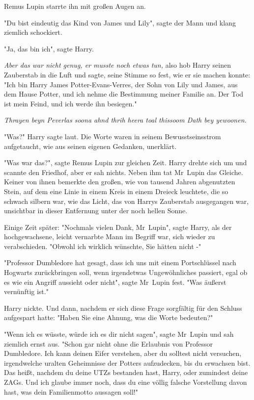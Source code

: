 {Remus Lupin starrte ihn mit großen Augen an.

"Du bist eindeutig das Kind von James und Lily", sagte der Mann und klang ziemlich schockiert.

"Ja, das bin ich", sagte Harry.

\emph{Aber das war nicht genug, er musste noch etwas tun,} also hob Harry seinen Zauberstab in die Luft und sagte, seine Stimme so fest, wie er sie machen konnte: "Ich bin Harry James Potter-Evans-Verres, der Sohn von Lily und James, aus dem Hause Potter, und ich nehme die Bestimmung meiner Familie an. Der Tod ist mein Feind, und ich werde ihn besiegen."

\emph{Thrayen beyn Peverlas soona ahnd thrih heera toal thissoom Dath bey yewoonen.}

"Was?" Harry sagte laut. Die Worte waren in seinem Bewusstseinsstrom aufgetaucht, wie aus seinen eigenen Gedanken, unerklärt.

"Was war das?", sagte Remus Lupin zur gleichen Zeit. Harry drehte sich um und scannte den Friedhof, aber er sah nichts. Neben ihm tat Mr~Lupin das Gleiche. Keiner von ihnen bemerkte den großen, wie von tausend Jahren abgenutzten Stein, auf dem eine Linie in einem Kreis in einem Dreieck leuchtete, die so schwach silbern war, wie das Licht, das von Harrys Zauberstab ausgegangen war, unsichtbar in dieser Entfernung unter der noch hellen Sonne.

Einige Zeit später: "Nochmals vielen Dank, Mr~Lupin", sagte Harry, als der hochgewachsene, leicht vernarbte Mann im Begriff war, sich wieder zu verabschieden. "Obwohl ich wirklich wünschte, Sie hätten nicht -"

"Professor Dumbledore hat gesagt, dass ich uns mit einem Portschlüssel nach Hogwarts zurückbringen soll, wenn irgendetwas Ungewöhnliches passiert, egal ob es wie ein Angriff aussieht oder nicht", sagte Mr~Lupin fest. "Was äußerst vernünftig ist."

Harry nickte. Und dann, nachdem er sich diese Frage sorgfältig für den Schluss aufgespart hatte: "Haben Sie eine Ahnung, was die Worte bedeuten?"

"Wenn ich es wüsste, würde ich es dir nicht sagen", sagte Mr~Lupin und sah ziemlich ernst aus. "Schon gar nicht ohne die Erlaubnis von Professor Dumbledore. Ich kann deinen Eifer verstehen, aber du solltest nicht versuchen, irgendwelche uralten Geheimnisse der Potters aufzudecken, bis du erwachsen bist. Das heißt, nachdem du deine UTZs bestanden hast, Harry, oder zumindest deine ZAGs. Und ich glaube immer noch, dass du eine völlig falsche Vorstellung davon hast, was dein Familienmotto aussagen soll!"

}
